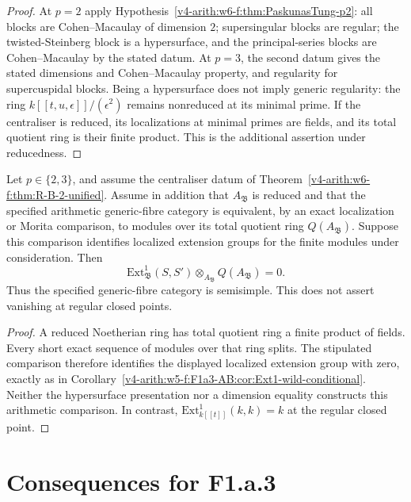 \begin{proof}
At \(p=2\) apply Hypothesis~\ref{v4-arith:w6-f:thm:PaskunasTung-p2}: all blocks
are Cohen--Macaulay of dimension \(2\); supersingular blocks are
regular; the twisted-Steinberg block is a hypersurface, and the
principal-series blocks are Cohen--Macaulay by the stated datum.
At \(p=3\), the second datum gives the stated dimensions and
Cohen--Macaulay property, and regularity for supercuspidal blocks.
Being a hypersurface does not imply generic regularity: the ring
\(k[[t,u,\epsilon]]/(\epsilon^2)\) remains nonreduced at its
minimal prime. If the centraliser is reduced, its localizations at
minimal primes are fields, and its total quotient ring is their
finite product. This is the additional assertion under reducedness.
\end{proof}

\begin{corollary}
\label{v4-arith:w6-f:cor:Ext1-wild-unconditional}
Let \(p\in\{2,3\}\), and assume the centraliser datum of
Theorem~\ref{v4-arith:w6-f:thm:R-B-2-unified}. Assume in addition that
\(A_{\mathfrak B}\) is reduced and that the specified arithmetic
generic-fibre category is equivalent, by an exact localization or
Morita comparison, to modules over its total quotient ring
\(Q(A_{\mathfrak B})\). Suppose this comparison identifies localized
extension groups for the finite modules under consideration. Then
\begin{equation}
\mathrm{Ext}^{1}_{\mathfrak B}(S,S')
 \otimes_{A_{\mathfrak B}}Q(A_{\mathfrak B})=0.
\end{equation}
Thus the specified generic-fibre category is semisimple. This does
not assert vanishing at regular closed points.
\end{corollary}

\begin{proof}
A reduced Noetherian ring has total quotient ring a finite product
of fields. Every short exact sequence of modules over that ring
splits. The stipulated comparison therefore identifies the displayed
localized extension group with zero, exactly as in
Corollary~\ref{v4-arith:w5-f:F1a3-AB:cor:Ext1-wild-conditional}.
Neither the hypersurface presentation nor a dimension equality
constructs this arithmetic comparison. In contrast,
\(\mathrm{Ext}^{1}_{k[[t]]}(k,k)=k\) at the regular closed point.
\end{proof}

\section{Consequences for F1.a.3}
\label{v4-arith:w6-f:table-update}

